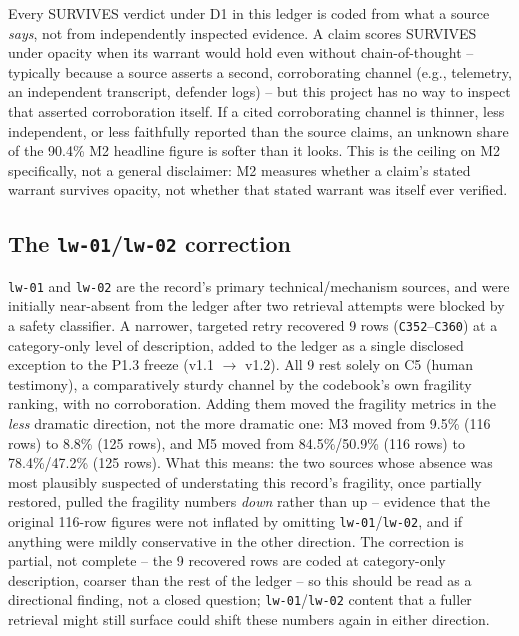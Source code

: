 Every SURVIVES verdict under D1 in this ledger is coded from what a source
\emph{says}, not from independently inspected evidence. A claim scores
SURVIVES under opacity when its warrant would hold even without
chain-of-thought -- typically because a source asserts a second,
corroborating channel (e.g., telemetry, an independent transcript, defender
logs) -- but this project has no way to inspect that asserted corroboration
itself. If a cited corroborating channel is thinner, less independent, or
less faithfully reported than the source claims, an unknown share of the
90.4\% M2 headline figure is softer than it looks. This is the ceiling on M2
specifically, not a general disclaimer: M2 measures whether a claim's stated
warrant survives opacity, not whether that stated warrant was itself ever
verified.

\subsection*{The \texttt{lw-01}/\texttt{lw-02} correction}

\texttt{lw-01} and \texttt{lw-02} are the record's primary technical/mechanism
sources, and were initially near-absent from the ledger after two retrieval
attempts were blocked by a safety classifier. A narrower, targeted retry
recovered 9 rows (\texttt{C352}--\texttt{C360}) at a category-only level of
description, added to the ledger as a single disclosed exception to the P1.3
freeze (v1.1 $\rightarrow$ v1.2). All 9 rest solely on C5 (human testimony), a
comparatively sturdy channel by the codebook's own fragility ranking, with no
corroboration. Adding them moved the fragility metrics in the \emph{less}
dramatic direction, not the more dramatic one: M3 moved from 9.5\% (116 rows)
to 8.8\% (125 rows), and M5 moved from 84.5\%/50.9\% (116 rows) to
78.4\%/47.2\% (125 rows). What this means: the two sources whose absence was
most plausibly suspected of understating this record's fragility, once
partially restored, pulled the fragility numbers \emph{down} rather than up --
evidence that the original 116-row figures were not inflated by omitting
\texttt{lw-01}/\texttt{lw-02}, and if anything were mildly conservative in the
other direction. The correction is partial, not complete -- the 9 recovered
rows are coded at category-only description, coarser than the rest of the
ledger -- so this should be read as a directional finding, not a closed
question; \texttt{lw-01}/\texttt{lw-02} content that a fuller retrieval might
still surface could shift these numbers again in either direction.

